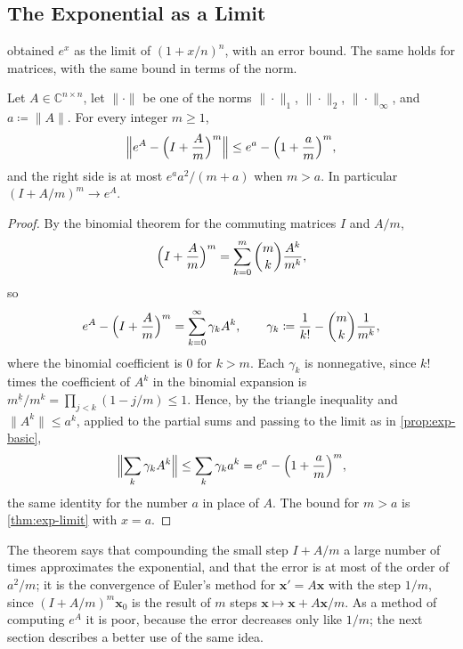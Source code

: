 \subsection{The Exponential as a Limit}

 obtained $e^x$ as the limit of $(1+x/n)^n$, with an error bound. The same holds for matrices, with the same bound in terms of the norm.

\begin{theorem}
\label{thm:exp-limit-matrix}
Let $A\in\mathbb C^{n\times n}$, let $\|\cdot\|$ be one of the norms $\|\cdot\|_1$, $\|\cdot\|_2$, $\|\cdot\|_\infty$, and $a\coloneqq\|A\|$. For every integer $m\ge1$,
\[
\Bigl\|e^A-\Bigl(I+\frac Am\Bigr)^m\Bigr\|\le e^a-\Bigl(1+\frac am\Bigr)^m ,
\]
and the right side is at most $e^aa^2/(m+a)$ when $m>a$. In particular $(I+A/m)^m\to e^A$.
\end{theorem}

\begin{proof}
By the binomial theorem for the commuting matrices $I$ and $A/m$,
\[
\Bigl(I+\frac Am\Bigr)^m=\sum_{k=0}^m\binom mk\frac{A^k}{m^k},
\]
so
\[
e^A-\Bigl(I+\frac Am\Bigr)^m=\sum_{k=0}^\infty\gamma_kA^k,\qquad\gamma_k\coloneqq\frac1{k!}-\binom mk\frac1{m^k},
\]
where the binomial coefficient is $0$ for $k>m$. Each $\gamma_k$ is nonnegative, since $k!$ times the coefficient of $A^k$ in the binomial expansion is $m^{\underline k}/m^k=\prod_{j<k}(1-j/m)\le1$. Hence, by the triangle inequality and $\|A^k\|\le a^k$, applied to the partial sums and passing to the limit as in \cref{prop:exp-basic},
\[
\Bigl\|\sum_k\gamma_kA^k\Bigr\|\le\sum_k\gamma_ka^k=e^a-\Bigl(1+\frac am\Bigr)^m ,
\]
the same identity for the number $a$ in place of $A$. The bound for $m>a$ is \cref{thm:exp-limit} with $x=a$.
\end{proof}

The theorem says that compounding the small step $I+A/m$ a large number of times approximates the exponential, and that the error is at most of the order of $a^2/m$; it is the convergence of Euler's method for $\mathbf x'=A\mathbf x$ with the step $1/m$, since $(I+A/m)^m\mathbf x_0$ is the result of $m$ steps $\mathbf x\mapsto\mathbf x+A\mathbf x/m$. As a method of computing $e^A$ it is poor, because the error decreases only like $1/m$; the next section describes a better use of the same idea.

